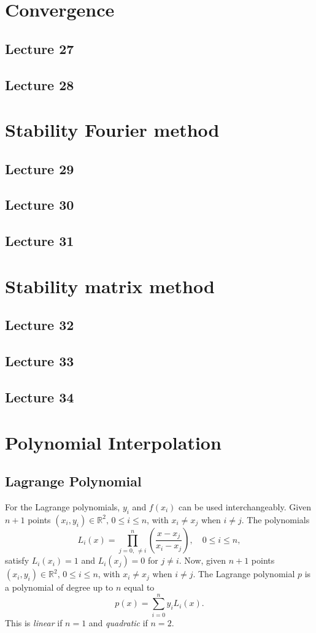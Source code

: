 \documentclass{article}
\begin{document}
\section{Convergence}
\subsection{Lecture 27}
\subsection{Lecture 28}


\section{Stability Fourier method}
\subsection{Lecture 29}
\subsection{Lecture 30}
\subsection{Lecture 31}


\section{Stability matrix method}
\subsection{Lecture 32}
\subsection{Lecture 33}
\subsection{Lecture 34}


\section{Polynomial Interpolation}
\subsection{Lagrange Polynomial}
For the Lagrange polynomials, $y_i$ and $f(x_i)$ can be used interchangeably.
Given $n+1$ points $(x_i,y_i) \in \mathbb{R}^2,\,0\leq i\leq n$, with $x_i\neq x_j$ when $i\neq j$. The polynomials
\begin{equation}
    L_i(x) = \prod_{j=0,\,\neq i}^n \left(\frac{x-x_j}{x_i-x_j}\right),\quad 0\leq i \leq n,
\end{equation}
satisfy $L_i(x_i)=1$ and $L_i(x_j)=0$ for $j\neq i$.
Now, given $n+1$ points $(x_i,y_i) \in \mathbb{R}^2,\,0\leq i\leq n$, with $x_i\neq x_j$ when $i\neq j$. The Lagrange polynomial $p$ is a polynomial of degree up to $n$ equal to
\begin{equation}
    p(x) = \sum_{i=0}^n y_iL_i(x).
\end{equation}
This is \textit{linear} if $n=1$ and \textit{quadratic} if $n=2$.
\end{document}
